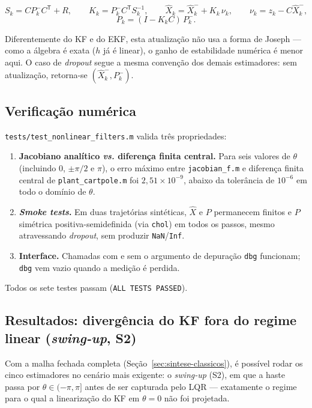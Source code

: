 \documentclass[brazil, 12pt]{article}
\begin{document}
\[
S_k = C P_k^{-} C^{\mathsf T} + R, \qquad
K_k = P_k^{-} C^{\mathsf T} S_k^{-1}, \qquad
\hat X_k = \hat X_k^{-} + K_k\,\nu_k, \qquad
\nu_k = z_k - C\hat X_k^{-},
\]
\[
P_k = (I-K_kC)\,P_k^{-}.
\]

Diferentemente do KF e do EKF, esta atualização não usa a forma de Joseph —
como a álgebra é exata ($h$ já é linear), o ganho de estabilidade numérica é
menor aqui. O caso de \emph{dropout} segue a mesma convenção dos demais
estimadores: sem atualização, retorna-se $(\hat X_k^{-},P_k^{-})$.

\subsection{Verificação numérica}
\label{sec:ekf-verificacao}

\texttt{tests/test\_nonlinear\_filters.m} valida três propriedades:

\begin{enumerate}
  \item \textbf{Jacobiano analítico \emph{vs.} diferença finita central.}
  Para seis valores de $\theta$ (incluindo $0$, $\pm\pi/2$ e $\pi$), o erro
  máximo entre \texttt{jacobian\_f.m} e diferença finita central de
  \texttt{plant\_cartpole.m} foi $2{,}51\times10^{-9}$, abaixo da tolerância
  de $10^{-6}$ em todo o domínio de $\theta$.
  \item \textbf{\emph{Smoke tests}.} Em duas trajetórias sintéticas, $\hat X$
  e $P$ permanecem finitos e $P$ simétrica positiva-semidefinida (via
  \texttt{chol}) em todos os passos, mesmo atravessando \emph{dropout}, sem
  produzir \texttt{NaN}/\texttt{Inf}.
  \item \textbf{Interface.} Chamadas com e sem o argumento de depuração
  \texttt{dbg} funcionam; \texttt{dbg} vem vazio quando a medição é perdida.
\end{enumerate}

Todos os sete testes passam (\texttt{ALL TESTS PASSED}).

\subsection{Resultados: divergência do KF fora do regime linear (\emph{swing-up}, S2)}
\label{sec:resultados-naolineares}

Com a malha fechada completa (Seção~\ref{sec:sintese-classicos}), é possível
rodar os cinco estimadores no cenário mais exigente: o \emph{swing-up} (S2), em que
a haste passa por $\theta\in(-\pi,\pi]$ antes de ser capturada pelo LQR —
exatamente o regime para o qual a linearização do KF em $\theta=0$ não foi
projetada.
\end{document}
